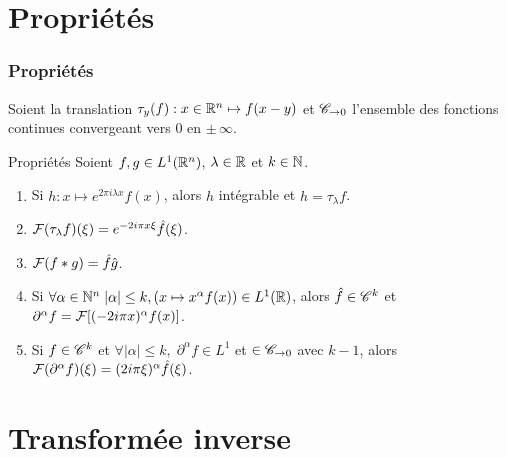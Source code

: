 \documentclass[usenames,dvipsnames]{beamer} %
\begin{document}

\section{Propriétés}



\begin{frame}
\frametitle{Propriétés}

Soient la translation $\tau_y(f) : x\in\mathbb{R}^n \mapsto f(x-y)$ et $\mathscr{C}_{\rightarrow0}$ l'ensemble des fonctions continues convergeant vers $0$ en $\pm\,\infty$.

\begin{alertblock}{Propriétés}
Soient $f,g\in L^1(\mathbb{R}^n)$, $\lambda\in\mathbb{R}$ et $k\in\mathbb{N}$.

\begin{enumerate}
    \item Si $h : x\mapsto e^{2\pi i \lambda x}f(x)$, alors $h$ intégrable et $\hat{h}=\tau_\lambda f$.
    \item $\fF(\tau_\lambda f)(\xi) = e^{-2i\pi x\xi} \hat{f}(\xi)$.
    \item $\fF (f \ast g) = \hat{f}\hat{g}$.
    \item Si $\forall \alpha\in\mathbb{N}^n\; |\alpha|\leq k, (x\mapsto x^\alpha f(x))\in L^1(\mathbb{R})$, alors $\hat{f}\in\mathscr{C}^k$ et $\partial^\alpha f = \fF[(-2i\pi x)^\alpha f(x)]$.
    \item Si $f\in\mathscr{C}^k$ et $\forall |\alpha|\leq k, \;\partial^\alpha f\in L^1$ et $\in \mathscr{C}_{\rightarrow 0}$ avec $k-1$, alors $\fF(\partial^\alpha f)(\xi) = (2i\pi\xi)^\alpha \hat{f}(\xi)$.
\end{enumerate}

\end{alertblock}

\end{frame}


\section{Transformée inverse}
\end{document}
